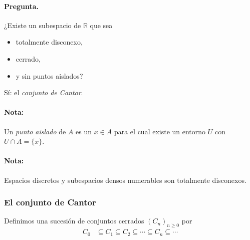 \paragraph{\textbf{Pregunta.}}
¿Existe un subespacio de $\mathbb R$ que sea
\begin{itemize}
  \item totalmente disconexo,
  \item cerrado,
  \item y sin puntos aislados?
\end{itemize}
Sí: el \emph{conjunto de Cantor}.

\paragraph{Nota:} Un \emph{punto aislado} de $A$ es un $x\in A$ para el cual existe un entorno $U$ con $U\cap A=\{x\}$.

\paragraph{Nota:} Espacios discretos y subespacios densos numerables son totalmente disconexos.

\subsubsection{El conjunto de Cantor}

%
%
Definimos una sucesión de conjuntos cerrados $(C_n)_{n\ge0}$ por
\begin{align*}
C_0 &\subseteq C_1 \subseteq C_2 \subseteq \dotsb \subseteq C_n \subseteq \dotsb
\end{align*}

